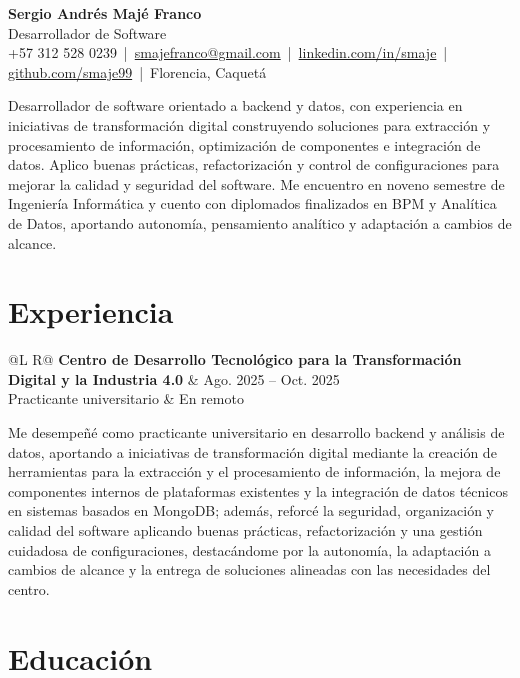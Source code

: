 \documentclass[10pt,letterpaper]{article}
\makeatletter
\newcommand{\entry}[5]{
  \begin{tabularx}{\textwidth}{@{}L R@{}}
    \textbf{#1} & #3 \\
    #2 & #4 \\
  \end{tabularx}
  \vspace{0.12em}
  #5
  \vspace{0.32em}
}
\makeatother
\begin{document}
\begin{center}
  {\LARGE \textbf{Sergio Andrés Majé Franco}}\\
  \vspace{0.12em}
  {\large Desarrollador de Software}\\
  \vspace{0.18em}
  +57 312 528 0239 \,|\, \href{mailto:smajefranco@gmail.com}{smajefranco@gmail.com} \,|\,
  \href{https://www.linkedin.com/in/smaje}{linkedin.com/in/smaje} \,|\,
  \href{https://github.com/smaje99}{github.com/smaje99} \,|\, Florencia, Caquetá
\end{center}

\vspace{0.12em}

Desarrollador de software orientado a backend y datos, con experiencia en iniciativas de transformación digital construyendo soluciones para extracción y procesamiento de información, optimización de componentes e integración de datos. Aplico buenas prácticas, refactorización y control de configuraciones para mejorar la calidad y seguridad del software. Me encuentro en noveno semestre de Ingeniería Informática y cuento con diplomados finalizados en BPM y Analítica de Datos, aportando autonomía, pensamiento analítico y adaptación a cambios de alcance.

\section*{Experiencia}

\entry
  {Centro de Desarrollo Tecnológico para la Transformación Digital y la Industria 4.0}
  {Practicante universitario}
  {Ago. 2025 -- Oct. 2025}
  {En remoto}
  {Me desempeñé como practicante universitario en desarrollo backend y análisis de datos, aportando a iniciativas de transformación digital mediante la creación de herramientas para la extracción y el procesamiento de información, la mejora de componentes internos de plataformas existentes y la integración de datos técnicos en sistemas basados en MongoDB; además, reforcé la seguridad, organización y calidad del software aplicando buenas prácticas, refactorización y una gestión cuidadosa de configuraciones, destacándome por la autonomía, la adaptación a cambios de alcance y la entrega de soluciones alineadas con las necesidades del centro.}

\section*{Educación}
\end{document}
